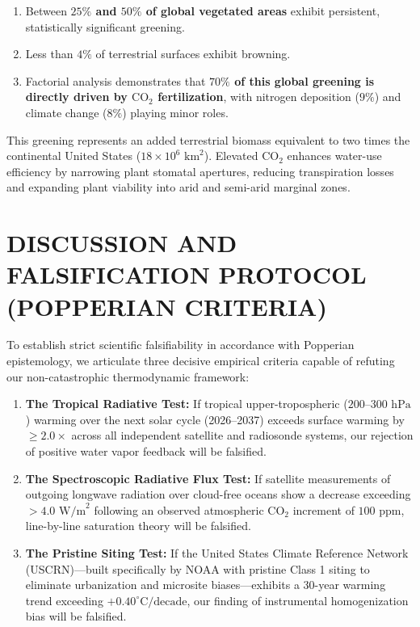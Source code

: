 \documentclass[10pt,twocolumn]{article}
\begin{document}
\begin{enumerate}
  \item Between \textbf{$25\%$ and $50\%$ of global vegetated areas} exhibit persistent, statistically significant greening.
  \item Less than \textbf{$4\%$} of terrestrial surfaces exhibit browning.
  \item Factorial analysis demonstrates that \textbf{$70\%$ of this global greening is directly driven by $\text{CO}_2$ fertilization}, with nitrogen deposition ($9\%$) and climate change ($8\%$) playing minor roles.
\end{enumerate}

This greening represents an added terrestrial biomass equivalent to two times the continental United States ($18 \times 10^6\text{ km}^2$). Elevated $\text{CO}_2$ enhances water-use efficiency by narrowing plant stomatal apertures, reducing transpiration losses and expanding plant viability into arid and semi-arid marginal zones.



\section{DISCUSSION AND FALSIFICATION PROTOCOL (POPPERIAN CRITERIA)}

To establish strict scientific falsifiability in accordance with Popperian epistemology, we articulate three decisive empirical criteria capable of refuting our non-catastrophic thermodynamic framework:

\begin{enumerate}
  \item \textbf{The Tropical Radiative Test:} If tropical upper-tropospheric ($200\text{--}300\text{ hPa}$) warming over the next solar cycle (2026–2037) exceeds surface warming by $\ge 2.0\times$ across all independent satellite and radiosonde systems, our rejection of positive water vapor feedback will be falsified.
  \item \textbf{The Spectroscopic Radiative Flux Test:} If satellite measurements of outgoing longwave radiation over cloud-free oceans show a decrease exceeding $>4.0\text{ W/m}^2$ following an observed atmospheric $\text{CO}_2$ increment of $100\text{ ppm}$, line-by-line saturation theory will be falsified.
  \item \textbf{The Pristine Siting Test:} If the United States Climate Reference Network (USCRN)—built specifically by NOAA with pristine Class 1 siting to eliminate urbanization and microsite biases—exhibits a 30-year warming trend exceeding $+0.40^\circ\text{C}/\text{decade}$, our finding of instrumental homogenization bias will be falsified.
\end{enumerate}
\end{document}
